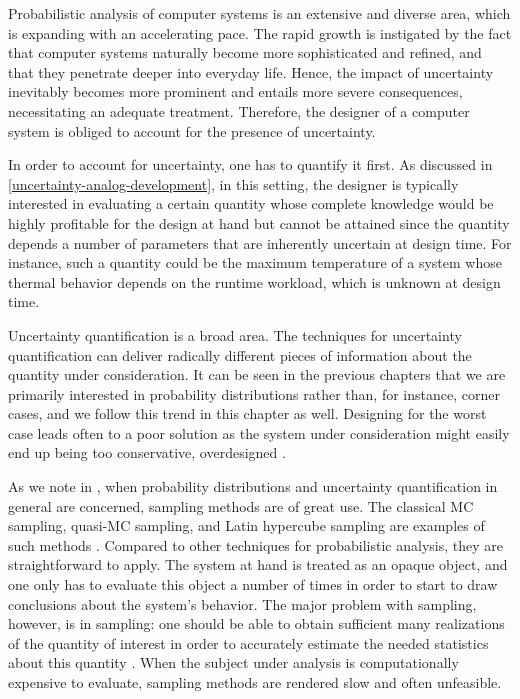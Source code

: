 Probabilistic analysis of computer systems is an extensive and diverse area,
which is expanding with an accelerating pace. The rapid growth is instigated by
the fact that computer systems naturally become more sophisticated and refined,
and that they penetrate deeper into everyday life. Hence, the impact of
uncertainty inevitably becomes more prominent and entails more severe
consequences, necessitating an adequate treatment. Therefore, the designer of a
computer system is obliged to account for the presence of uncertainty.

In order to account for uncertainty, one has to quantify it first. As discussed
in \cref{uncertainty-analog-development}, in this setting, the designer is
typically interested in evaluating a certain quantity whose complete knowledge
would be highly profitable for the design at hand but cannot be attained since
the quantity depends a number of parameters that are inherently uncertain at
design time. For instance, such a quantity could be the maximum temperature of a
system whose thermal behavior depends on the runtime workload, which is unknown
at design time.

Uncertainty quantification \cite{maitre2010} is a broad area. The techniques for
uncertainty quantification can deliver radically different pieces of information
about the quantity under consideration. It can be seen in the previous chapters
that we are primarily interested in probability distributions rather than, for
instance, corner cases, and we follow this trend in this chapter as well.
Designing for the worst case leads often to a poor solution as the system under
consideration might easily end up being too conservative, overdesigned
\cite{quinton2012}.

As we note in , when probability distributions and uncertainty
quantification in general are concerned, sampling methods are of great use. The
classical \acf{MC} sampling, quasi-\ac{MC} sampling, and Latin hypercube
sampling are examples of such methods \cite{asmussen2007}. Compared to other
techniques for probabilistic analysis, they are straightforward to apply. The
system at hand is treated as an opaque object, and one only has to evaluate this
object a number of times in order to start to draw conclusions about the
system's behavior. The major problem with sampling, however, is in sampling: one
should be able to obtain sufficient many realizations of the quantity of
interest in order to accurately estimate the needed statistics about this
quantity \cite{diaz-emparanza2002}. When the subject under analysis is
computationally expensive to evaluate, sampling methods are rendered slow and
often unfeasible.

